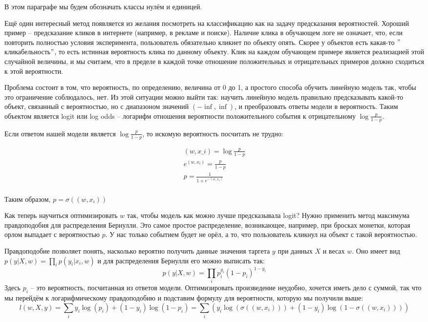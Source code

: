 В этом параграфе мы будем обозначать классы нулём и единицей.

Ещё один интересный метод появляется из желания посмотреть на классификацию как на задачу предсказания вероятностей.
Хороший пример -- предсказание кликов в интернете (например, в рекламе и поиске).
Наличие клика в обучающем логе не означает, что, если повторить полностью условия эксперимента, пользователь
обязательно кликнет по объекту опять.
Скорее у объектов есть какая-то \("\)кликабельность\("\), то есть истинная вероятность клика по данному объекту.
Клик на каждом обучающем примере является реализацией этой случайной величины, и мы считаем, что в пределе в каждой
точке отношение положительных и отрицательных примеров должно сходиться к этой вероятности.

Проблема состоит в том, что вероятность, по определению, величина от 0 до 1, а простого способа обучить линейную
модель так, чтобы это ограничение соблюдалось, нет.
Из этой ситуации можно выйти так: научить линейную модель правильно предсказывать какой-то объект, связанный с
вероятностью, но с диапазоном значений $(-\inf, \inf)$, и преобразовать ответы модели в вероятность.
Таким объектом является logit или log odds -- логарифм отношения вероятности положительного события к
отрицательному $\log \frac{p}{1 - p}$.

Если ответом нашей модели является $\log \frac{p}{1 - p}$, то искомую вероятность посчитать не трудно:

\begin{gather*}
(w, x\_i) = \log \frac{p}{1 - p}\\
    e^{(w, x_i)} = \frac{p}{1 - p}\\
    p = \frac{1}{1 + e^{-(w, x_i)}}\\
\end{gather*}

Таким образом, $p = \sigma ((w,x_i))$

Как теперь научиться оптимизировать $w$ так, чтобы модель как можно лучше предсказывала logit?
Нужно применить метод максимума правдоподобия для распределения Бернулли.
Это самое простое распределение, возникающее, например, при бросках монетки, которая орлом выпадает с вероятностью $p$.
У нас только событием будет не орёл, а то, что пользователь кликнул на объект с такой вероятностью.

Правдоподобие позволяет понять, насколько вероятно получить данные значения таргета $y$ при данных $X$ и весах $w$.
Оно имеет вид $p (y | X, w) = \prod_i p(y_i|x_i,w)$ и для распределения Бернулли его можно выписать так:
\[ p (y | X, w) = \prod_i p_i^{y_i}(1 - p_i)^{1 - y_i} \]
Здесь $p_i$ -- это вероятность, посчитанная из ответов модели.
Оптимизировать произведение неудобно, хочется иметь дело с суммой, так что мы перейдём к логарифмическому
правдоподобию и подставим формулу для вероятности, которую мы получили выше:
\[ l(w, X, y) = \sum_i y_i \log(p_i) + (1 - y_i) \log (1 - p_i) = \sum_i (y_i \log(\sigma ((w, x_i))) + (1 - y_i)
\log (1 - \sigma ((w, x_i)))) \]

